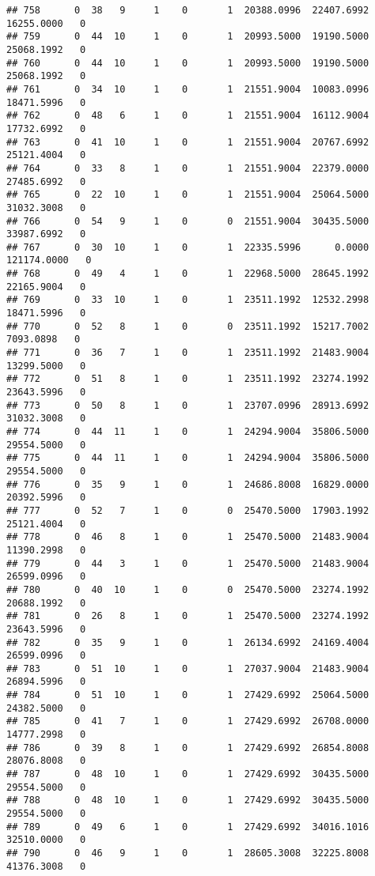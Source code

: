 \documentclass[
]{article}
\begin{document}
\begin{enumerate}
\begin{verbatim}
## 758      0  38   9     1    0       1  20388.0996  22407.6992  16255.0000   0
## 759      0  44  10     1    0       1  20993.5000  19190.5000  25068.1992   0
## 760      0  44  10     1    0       1  20993.5000  19190.5000  25068.1992   0
## 761      0  34  10     1    0       1  21551.9004  10083.0996  18471.5996   0
## 762      0  48   6     1    0       1  21551.9004  16112.9004  17732.6992   0
## 763      0  41  10     1    0       1  21551.9004  20767.6992  25121.4004   0
## 764      0  33   8     1    0       1  21551.9004  22379.0000  27485.6992   0
## 765      0  22  10     1    0       1  21551.9004  25064.5000  31032.3008   0
## 766      0  54   9     1    0       0  21551.9004  30435.5000  33987.6992   0
## 767      0  30  10     1    0       1  22335.5996      0.0000 121174.0000   0
## 768      0  49   4     1    0       1  22968.5000  28645.1992  22165.9004   0
## 769      0  33  10     1    0       1  23511.1992  12532.2998  18471.5996   0
## 770      0  52   8     1    0       0  23511.1992  15217.7002   7093.0898   0
## 771      0  36   7     1    0       1  23511.1992  21483.9004  13299.5000   0
## 772      0  51   8     1    0       1  23511.1992  23274.1992  23643.5996   0
## 773      0  50   8     1    0       1  23707.0996  28913.6992  31032.3008   0
## 774      0  44  11     1    0       1  24294.9004  35806.5000  29554.5000   0
## 775      0  44  11     1    0       1  24294.9004  35806.5000  29554.5000   0
## 776      0  35   9     1    0       1  24686.8008  16829.0000  20392.5996   0
## 777      0  52   7     1    0       0  25470.5000  17903.1992  25121.4004   0
## 778      0  46   8     1    0       1  25470.5000  21483.9004  11390.2998   0
## 779      0  44   3     1    0       1  25470.5000  21483.9004  26599.0996   0
## 780      0  40  10     1    0       0  25470.5000  23274.1992  20688.1992   0
## 781      0  26   8     1    0       1  25470.5000  23274.1992  23643.5996   0
## 782      0  35   9     1    0       1  26134.6992  24169.4004  26599.0996   0
## 783      0  51  10     1    0       1  27037.9004  21483.9004  26894.5996   0
## 784      0  51  10     1    0       1  27429.6992  25064.5000  24382.5000   0
## 785      0  41   7     1    0       1  27429.6992  26708.0000  14777.2998   0
## 786      0  39   8     1    0       1  27429.6992  26854.8008  28076.8008   0
## 787      0  48  10     1    0       1  27429.6992  30435.5000  29554.5000   0
## 788      0  48  10     1    0       1  27429.6992  30435.5000  29554.5000   0
## 789      0  49   6     1    0       1  27429.6992  34016.1016  32510.0000   0
## 790      0  46   9     1    0       1  28605.3008  32225.8008  41376.3008   0

\end{verbatim}
\end{enumerate}
\end{document}

